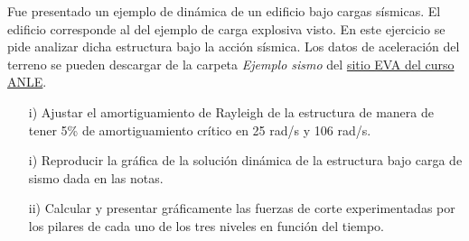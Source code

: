 \bigskip
\begin{exercise}
	
	Fue presentado un ejemplo de dinámica de un edificio bajo cargas sísmicas. El edificio corresponde al del ejemplo de carga explosiva visto. En este ejercicio se pide analizar dicha estructura bajo la acción sísmica. Los datos de aceleración del terreno se pueden descargar de la carpeta \textit{Ejemplo sismo} del  \href{https://eva.fing.edu.uy/course/view.php?id=1043}{sitio EVA del curso ANLE}.
	
	\begin{itemize}
		
		\item[i)] Ajustar el amortiguamiento de Rayleigh de la estructura de manera de tener 5\% de amortiguamiento crítico en 25 rad/s y 106 rad/s.
		
		\item[i)] Reproducir la gráfica de la solución dinámica de la estructura bajo carga de sismo dada en las notas.
		
		\item[ii)] Calcular y presentar gráficamente las fuerzas de corte experimentadas por los pilares de cada uno de los tres niveles en función del tiempo.
		
	\end{itemize}
	
\end{exercise}


